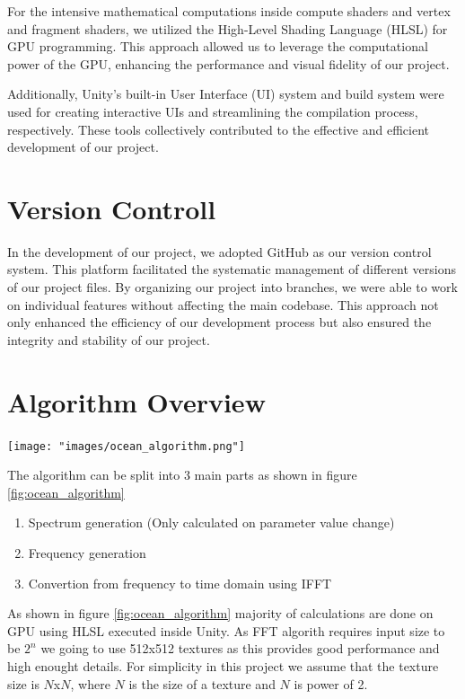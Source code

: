 For the intensive mathematical computations inside compute shaders and vertex and fragment shaders, we utilized the High-Level Shading Language (HLSL) for GPU programming. This approach allowed us to leverage the computational power of the GPU, enhancing the performance and visual fidelity of our project.

Additionally, Unity’s built-in User Interface (UI) system and build system were used for creating interactive UIs and streamlining the compilation process, respectively. These tools collectively contributed to the effective and efficient development of our project.

\section{Version Controll}
In the development of our project, we adopted GitHub as our version control system. This platform facilitated the systematic management of different versions of our project files. By organizing our project into branches, we were able to work on individual features without affecting the main codebase. This approach not only enhanced the efficiency of our development process but also ensured the integrity and stability of our project.

\section{Algorithm Overview}

\begin{minipage}{1\textwidth}
    \centering
    \texttt{[image: "images/ocean\_algorithm.png"]}
    \label{fig:ocean_algorithm}
\end{minipage}

The algorithm can be split into 3 main parts as shown in figure \ref{fig:ocean_algorithm}
\begin{enumerate}
    \item Spectrum generation (Only calculated on parameter value change)
    \item Frequency generation
    \item Convertion from frequency to time domain using IFFT
\end{enumerate}
As shown in figure \ref{fig:ocean_algorithm} majority of calculations are done on GPU using HLSL executed inside Unity. As FFT algorith requires input size to be $2^n$ we going to use 512x512 textures as this provides good performance and high enought details. For simplicity in this project we assume that the texture size is $N$x$N$, where $N$ is the size of a texture and $N$ is power of 2.

